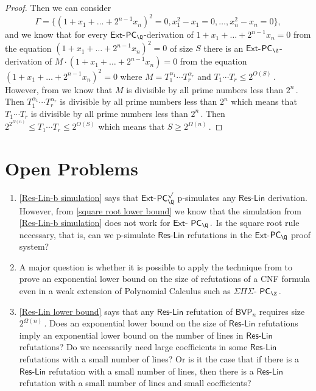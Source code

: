 \documentclass{toc}
\begin{document}
\begin{proof}
Then we can consider 
$$
\Gamma = \{(1 + x_1 + \ldots + 2^{n - 1} x_n)^2 = 0, x_1^2 - x_1 = 0, \ldots, x_n^2 - x_n = 0\},
$$
%
and we know that for every $\mathsf{Ext}$-$\mathsf{PC}_{\Q}$-derivation of $1 + x_1 + \ldots + 2^{n - 1} x_n = 0$ from the equation $(1 + x_1 + \ldots + 2^{n - 1} x_n)^2 = 0$ of size $S$ there is an $\mathsf{Ext}$-$\mathsf{PC}_{\Z}$-derivation of $M \cdot (1 + x_1 + \ldots + 2^{n - 1} x_n) = 0$ from the equation $(1 + x_1 + \ldots + 2^{n - 1} x_n)^2 = 0$ where $M = T_1^{\alpha_1} \cdots T_r^{\alpha_r}$ and %
$T_1 \cdots T_r \le 2^{O(S)}\,.$ %
 However, from %
%
%
we know that $M$ is divisible by all prime numbers less than %
$2^n\,.$ %
 Then $T_1^{\alpha_1} \cdots T_r^{\alpha_r}$ is divisible by all prime numbers less than $2^n$ which means that $T_1 \cdots T_r$ is divisible by all prime numbers less than %
$2^n\,.$ %
%
Then $2^{2^{\Omega(n)}} \le T_1 \cdots T_r \le 2^{O(S)}$ %
which means that %
$S \ge 2^{\Omega(n)}\,.$ %
\end{proof}  %

%
\section{Open Problems} %
\begin{enumerate}
    \item \autoref{Res-Lin-b simulation} says that $\mathsf{Ext}$-$\mathsf{PC}_{\Q}^{\surd}$ p-simulates any $\mathsf{Res}$-$\mathsf{Lin}$ derivation. However, from \autoref{square root lower bound} we know that the simulation from \autoref{Res-Lin-b simulation} does not work  for $\mathsf{Ext}$-%
$\mathsf{PC}_{\Q}\,.$ %
 Is the square root rule necessary, that is, can we p-simulate  $\mathsf{Res}$-$\mathsf{Lin}$ refutations in the $\mathsf{Ext}$-$\mathsf{PC}_{\Q}$ proof system?
    \item A major question is whether it is possible to apply the technique from  to prove an exponential lower bound on the size of refutations of a CNF formula even in a weak extension of Polynomial Calculus such as $\Sigma\Pi\Sigma$-%
$\mathsf{PC}_{\Z}\,.$ %
%
    \item \autoref{Res-Lin lower bound} says that any $\mathsf{Res}$-$\mathsf{Lin}$ refutation of $\mathsf{BVP}_n$ requires size  %
$2^{\Omega(n)}\,.$ %
 Does an exponential lower bound on the size of $\mathsf{Res}$-$\mathsf{Lin}$ refutations imply an exponential lower bound on the number of lines in $\mathsf{Res}$-$\mathsf{Lin}$ refutations? Do we necessarily need large coefficients in some $\mathsf{Res}$-$\mathsf{Lin}$ refutations with a small number of lines? Or is it the case that if there is a $\mathsf{Res}$-$\mathsf{Lin}$ refutation with a small number of lines, then there is a $\mathsf{Res}$-$\mathsf{Lin}$ refutation with a small number of lines and small coefficients? %
\end{enumerate}
\end{document}
